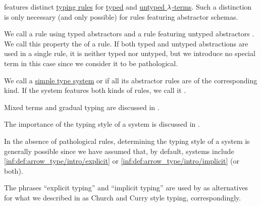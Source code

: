\begin{definition}\label{def:simple_type_system_style}\mimprovised
   features distinct \hyperref[def:simple_typing_rule]{typing rules} for \hyperref[def:typed_lambda_term]{typed} and \hyperref[def:lambda_term]{untyped \( {\mathrm \lambda} \)-terms}. Such a distinction is only necessary (and only possible) for rules featuring abstractor schemas.

  We call a rule using typed abstractors  and a rule featuring untyped abstractors . We call this property the  of a rule. If both typed and untyped abstractions are used in a single rule, it is neither typed nor untyped, but we introduce no special term in this case since we consider it to be pathological.

  We call a \hyperref[def:simple_type_system]{simple type system}  or  if all its abstractor rules are of the corresponding kind. If the system features both kinds of rules, we call it .
\end{definition}
\begin{comments}
  \item Mixed terms and gradual typing are discussed in .

  \item The importance of the typing style of a system is discussed in .

  \item In the absence of pathological rules, determining the typing style of a system is generally possible since we have assumed that, by default, systems include \ref{inf:def:arrow_type/intro/explicit} or \ref{inf:def:arrow_type/intro/implicit} (or both).

  \item The phrases \enquote{explicit typing} and \enquote{implicit typing} are used by  as alternatives for what we described in  as Church and Curry style typing, correspondingly.
\end{comments}

